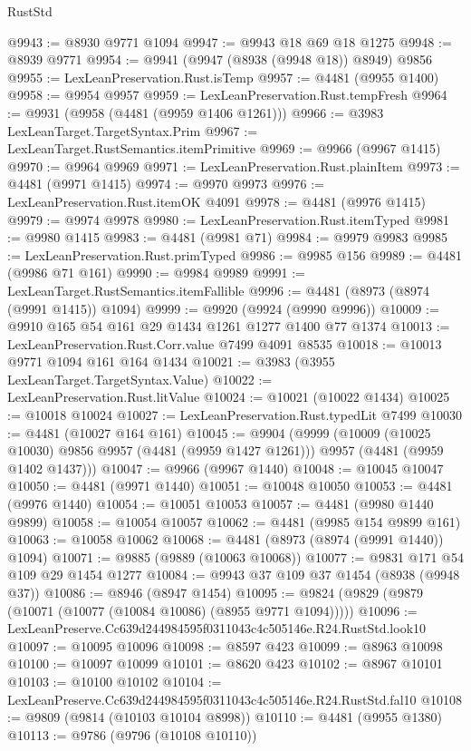 \begin{lexlean}{RustStd}
\begin{coremodule}
@9943 := @8930 @9771 @1094
@9947 := @9943 @18 @69 @18 @1275
@9948 := @8939 @9771
@9954 := @9941 (@9947 (@8938 (@9948 @18)) @8949) @9856
@9955 := LexLeanPreservation.Rust.isTemp
@9957 := @4481 (@9955 @1400)
@9958 := @9954 @9957
@9959 := LexLeanPreservation.Rust.tempFresh
@9964 := @9931 (@9958 (@4481 (@9959 @1406 @1261)))
@9966 := @3983 LexLeanTarget.TargetSyntax.Prim
@9967 := LexLeanTarget.RustSemantics.itemPrimitive
@9969 := @9966 (@9967 @1415)
@9970 := @9964 @9969
@9971 := LexLeanPreservation.Rust.plainItem
@9973 := @4481 (@9971 @1415)
@9974 := @9970 @9973
@9976 := LexLeanPreservation.Rust.itemOK @4091
@9978 := @4481 (@9976 @1415)
@9979 := @9974 @9978
@9980 := LexLeanPreservation.Rust.itemTyped
@9981 := @9980 @1415
@9983 := @4481 (@9981 @71)
@9984 := @9979 @9983
@9985 := LexLeanPreservation.Rust.primTyped
@9986 := @9985 @156
@9989 := @4481 (@9986 @71 @161)
@9990 := @9984 @9989
@9991 := LexLeanTarget.RustSemantics.itemFallible
@9996 := @4481 (@8973 (@8974 (@9991 @1415)) @1094)
@9999 := @9920 (@9924 (@9990 @9996))
@10009 := @9910 @165 @54 @161 @29 @1434 @1261 @1277 @1400 @77 @1374
@10013 := LexLeanPreservation.Rust.Corr.value @7499 @4091 @8535
@10018 := @10013 @9771 @1094 @161 @164 @1434
@10021 := @3983 (@3955 LexLeanTarget.TargetSyntax.Value)
@10022 := LexLeanPreservation.Rust.litValue
@10024 := @10021 (@10022 @1434)
@10025 := @10018 @10024
@10027 := LexLeanPreservation.Rust.typedLit @7499
@10030 := @4481 (@10027 @164 @161)
@10045 := @9904
    (@9999
      (@10009 (@10025 @10030) @9856 @9957 (@4481 (@9959 @1427 @1261)))
      @9957
      (@4481 (@9959 @1402 @1437)))
@10047 := @9966 (@9967 @1440)
@10048 := @10045 @10047
@10050 := @4481 (@9971 @1440)
@10051 := @10048 @10050
@10053 := @4481 (@9976 @1440)
@10054 := @10051 @10053
@10057 := @4481 (@9980 @1440 @9899)
@10058 := @10054 @10057
@10062 := @4481 (@9985 @154 @9899 @161)
@10063 := @10058 @10062
@10068 := @4481 (@8973 (@8974 (@9991 @1440)) @1094)
@10071 := @9885 (@9889 (@10063 @10068))
@10077 := @9831 @171 @54 @109 @29 @1454 @1277
@10084 := @9943 @37 @109 @37 @1454 (@8938 (@9948 @37))
@10086 := @8946 (@8947 @1454)
@10095 := @9824 (@9829 (@9879 (@10071 (@10077 (@10084 @10086) (@8955 @9771 @1094)))))
@10096 := LexLeanPreserve.Cc639d244984595f0311043c4c505146e.R24.RustStd.look10
@10097 := @10095 @10096
@10098 := @8597 @423
@10099 := @8963 @10098
@10100 := @10097 @10099
@10101 := @8620 @423
@10102 := @8967 @10101
@10103 := @10100 @10102
@10104 := LexLeanPreserve.Cc639d244984595f0311043c4c505146e.R24.RustStd.fal10
@10108 := @9809 (@9814 (@10103 @10104 @8998))
@10110 := @4481 (@9955 @1380)
@10113 := @9786 (@9796 (@10108 @10110))

\end{coremodule}
\end{lexlean}
